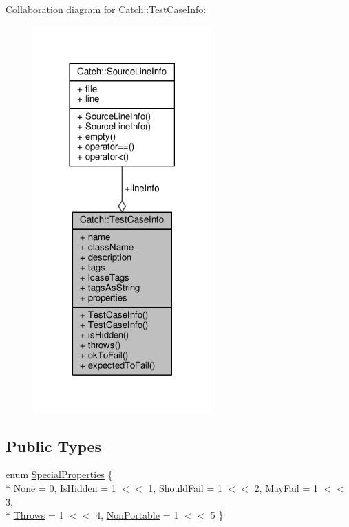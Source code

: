 Collaboration diagram for Catch\-:\-:Test\-Case\-Info\-:
\nopagebreak
\begin{figure}[H]
\begin{center}
\leavevmode
\includegraphics[width=194pt]{struct_catch_1_1_test_case_info__coll__graph}
\end{center}
\end{figure}
\subsection*{Public Types}
\begin{DoxyCompactItemize}
\item 
enum \hyperlink{struct_catch_1_1_test_case_info_a39b232f74b4a7a6f2183b96759027eac}{Special\-Properties} \{ \\*
\hyperlink{struct_catch_1_1_test_case_info_a39b232f74b4a7a6f2183b96759027eacaf94e9de5f8ec1e53b1aa761ec564b31a}{None} = 0, 
\hyperlink{struct_catch_1_1_test_case_info_a39b232f74b4a7a6f2183b96759027eacaeda53906c14c3973e0980900c132b8f7}{Is\-Hidden} = 1 $<$$<$ 1, 
\hyperlink{struct_catch_1_1_test_case_info_a39b232f74b4a7a6f2183b96759027eacaf9002285bccfc343935958f3953f4c01}{Should\-Fail} = 1 $<$$<$ 2, 
\hyperlink{struct_catch_1_1_test_case_info_a39b232f74b4a7a6f2183b96759027eacadf1873d3271121cb9f52d7df45b416ca}{May\-Fail} = 1 $<$$<$ 3, 
\\*
\hyperlink{struct_catch_1_1_test_case_info_a39b232f74b4a7a6f2183b96759027eaca4704adf89ed7f7ad653d08f99813a974}{Throws} = 1 $<$$<$ 4, 
\hyperlink{struct_catch_1_1_test_case_info_a39b232f74b4a7a6f2183b96759027eaca06472887b53fda9eb8015d74e7fd2cf1}{Non\-Portable} = 1 $<$$<$ 5
 \}
\end{DoxyCompactItemize}
